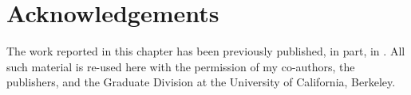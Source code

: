 \section*{Acknowledgements}

The work reported in this chapter has been previously published, in part, in
\textcite{clark_knowledge_inpress}.  All such material is re-used here with the
permission of my co-authors, the publishers, and the Graduate Division at the
University of California, Berkeley.
